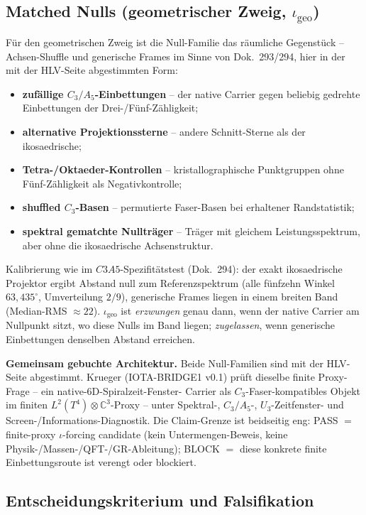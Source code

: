 \subsection*{Matched Nulls (geometrischer Zweig, $\iota_{\text{geo}}$)}

Für den geometrischen Zweig ist die Null-Familie das räumliche Gegenstück --
Achsen-Shuffle und generische Frames im Sinne von Dok.~293/294, hier in der
mit der HLV-Seite abgestimmten Form:
\begin{itemize}
  \item \textbf{zufällige $C_3/A_5$-Einbettungen} -- der native Carrier
    gegen beliebig gedrehte Einbettungen der Drei-/Fünf-Zähligkeit;
  \item \textbf{alternative Projektionssterne} -- andere Schnitt-Sterne als
    der ikosaedrische;
  \item \textbf{Tetra-/Oktaeder-Kontrollen} -- kristallographische
    Punktgruppen ohne Fünf-Zähligkeit als Negativkontrolle;
  \item \textbf{shuffled $C_3$-Basen} -- permutierte Faser-Basen bei
    erhaltener Randstatistik;
  \item \textbf{spektral gematchte Nullträger} -- Träger mit gleichem
    Leistungsspektrum, aber ohne die ikosaedrische Achsenstruktur.
\end{itemize}
Kalibrierung wie im $C3A5$-Spezifitätstest (Dok.~294): der exakt
ikosaedrische Projektor ergibt Abstand null zum Referenzspektrum (alle
fünfzehn Winkel $63{,}435^\circ$, Umverteilung $2/9$), generische Frames
liegen in einem breiten Band (Median-RMS $\approx 22$). $\iota_{\text{geo}}$
ist \emph{erzwungen} genau dann, wenn der native Carrier am Nullpunkt sitzt,
wo diese Nulls im Band liegen; \emph{zugelassen}, wenn generische
Einbettungen denselben Abstand erreichen.

\medskip\noindent\textbf{Gemeinsam gebuchte Architektur.} Beide
Null-Familien sind mit der HLV-Seite abgestimmt. Krueger (IOTA-BRIDGE1
v0.1) prüft dieselbe finite Proxy-Frage -- ein native-$6$D-Spiralzeit-Fenster-
Carrier als $C_3$-Faser-kompatibles Objekt im finiten
$L^2(T^4)\otimes\mathbb{C}^3$-Proxy -- unter Spektral-, $C_3/A_5$-,
$U_3$-Zeitfenster- und Screen-/Informations-Diagnostik. Die Claim-Grenze ist
beidseitig eng: PASS $=$ finite-proxy $\iota$-forcing candidate (kein
Untermengen-Beweis, keine Physik-/Massen-/QFT-/GR-Ableitung); BLOCK $=$ diese
konkrete finite Einbettungsroute ist verengt oder blockiert.

\subsection*{Entscheidungskriterium und Falsifikation}

